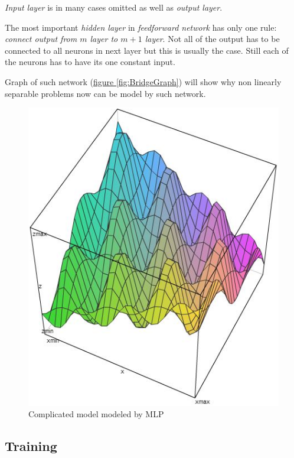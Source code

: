 \textit{Input layer} is in many cases omitted as well as \textit{output layer}.

The most important \textit{hidden layer} in \textit{feedforward network} has only one rule: \textit{connect output from $m$ layer to $m+1$ layer}. Not all of the output has to be connected to all neurons in next layer but this is usually the case. Still each of the neurons has to have its one constant input.

Graph of such network (\hyperref[fig:BridgeGraph]{figure \ref{fig:BridgeGraph}}) will show why non linearly separable problems now can be model by such network.

\begin{figure}[!h]
    \centering
    \includegraphics[scale=0.8]{Media/SolutionGraph.png}
    \caption{Complicated model modeled by MLP}
    \label{fig:SolutionGraph}
\end{figure}

\newpage
\subsection{Training}
\label{sec:Training}
